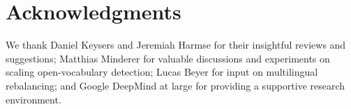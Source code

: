 \section*{Acknowledgments}

We thank Daniel Keysers and Jeremiah Harmse for their insightful reviews and suggestions; Matthias Minderer for valuable discussions and experiments on scaling open-vocabulary detection; Lucas Beyer for input on multilingual rebalancing; and Google DeepMind at large for providing a supportive research environment.

